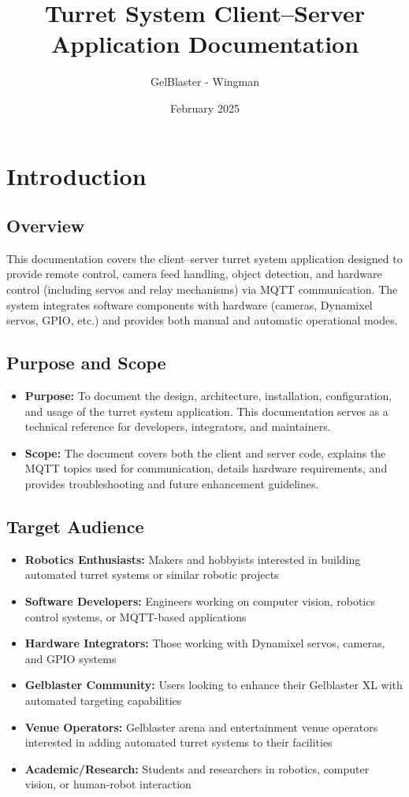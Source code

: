 \documentclass[12pt]{article}
\title{Turret System Client--Server Application Documentation}
\author{GelBlaster - Wingman}
\date{February 2025}
\begin{document}
\maketitle
\tableofcontents
\newpage

\section{Introduction}

\subsection{Overview}
This documentation covers the client--server turret system application designed to provide remote control, camera feed handling, object detection, and hardware control (including servos and relay mechanisms) via MQTT communication. The system integrates software components with hardware (cameras, Dynamixel servos, GPIO, etc.) and provides both manual and automatic operational modes.

\subsection{Purpose and Scope}
\begin{itemize}[leftmargin=*, label={--}]
    \item \textbf{Purpose:} To document the design, architecture, installation, configuration, and usage of the turret system application. This documentation serves as a technical reference for developers, integrators, and maintainers.
    \item \textbf{Scope:} The document covers both the client and server code, explains the MQTT topics used for communication, details hardware requirements, and provides troubleshooting and future enhancement guidelines.
\end{itemize}

\subsection{Target Audience}
\begin{itemize}[leftmargin=*, label={--}]
    \item \textbf{Robotics Enthusiasts:} Makers and hobbyists interested in building automated turret systems or similar robotic projects
    \item \textbf{Software Developers:} Engineers working on computer vision, robotics control systems, or MQTT-based applications
    \item \textbf{Hardware Integrators:} Those working with Dynamixel servos, cameras, and GPIO systems
    \item \textbf{Gelblaster Community:} Users looking to enhance their Gelblaster XL with automated targeting capabilities
    \item \textbf{Venue Operators:} Gelblaster arena and entertainment venue operators interested in adding automated turret systems to their facilities
    \item \textbf{Academic/Research:} Students and researchers in robotics, computer vision, or human-robot interaction
\end{itemize}
\end{document}
